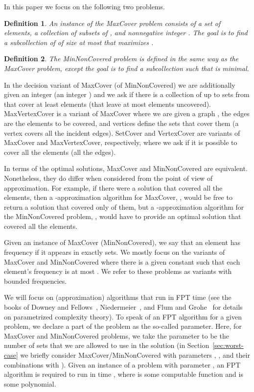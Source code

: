 \documentclass[11pt]{article}
\newtheorem{definition}{Definition}
\begin{document}
In this paper we focus on the following two problems.
\begin{definition}
  An instance  of the MaxCover problem consists of a
  set  of  elements, a collection 
  of  subsets of , and nonnegative integer . The goal is to
  find a subcollection  of  of size at most  that
  maximizes .
\end{definition}

\begin{definition}
  The MinNonCovered problem is defined in the same way as the MaxCover
  problem, except the goal is to find a subcollection  such
  that  is minimal.
\end{definition}
In the decision variant of MaxCover (of MinNonCovered) we are
additionally given an integer  (an integer ) and we ask if
there is a collection of up to  sets from  that cover at
least  elements (that leave at most  elements
uncovered). MaxVertexCover is a variant of MaxCover where we are given
a graph , the edges are the elements to be covered, and
vertices define the sets that cover them (a vertex covers all the
incident edges). SetCover and VertexCover are variants of MaxCover and
MaxVertexCover, respectively, where we ask if it is possible to cover
all the elements (all the edges).


In terms of the optimal solutions, MaxCover and MinNonCovered are
equivalent. None\-theless, they do differ when considered from the
point of view of approximation. For example, if there were a solution
that covered all the  elements, then a -approximation
algorithm for MaxCover, , would be free to return a
solution that covered only  of them, but a
-approximation algorithm for the MinNonCovered problem,
, would have to provide an optimal solution that covered
all the elements.

Given an instance  of MaxCover (MinNonCovered), we say that an
element  has frequency  if it appears in exactly  sets.  We
mostly focus on the variants of MaxCover and MinNonCovered where there
is a given constant  such that each element's frequency is at most
. We refer to these problems as variants with bounded frequencies.

We will focus on (approximation) algorithms that run in FPT time (see
the books of Downey and Fellows~\cite{dow-fel:b:parameterized},
Niedermeier~\cite{nie:b:invitation-fpt}, and Flum and
Grohe~\cite{flu-gro:b:parameterized-complexity} for details on
parametrized complexity theory). To speak of an FPT algorithm for a
given problem, we declare a part of the problem as the so-called
parameter. Here, for MaxCover and MinNonCovered problems, we take the
parameter to be the number  of sets that we are allowed to use in
the solution (in Section~\ref{sec:worst-case} we briefly consider
MaxCover/MinNonCovered with parameters , , and their
combinations with ). Given an instance  of a problem with
parameter , an FPT algorithm is required to run in time
, where  is some computable function and  is
some polynomial.
\end{document}
